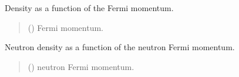 \documentclass[letterpaper,10pt,english]{sphinxmanual}
\begin{document}

\begin{fulllineitems}
\label{\detokenize{source/api/setup_eos_ffg:nucleardatapy.setup_eos_ffg.den}}
\pysigstartsignatures
\pysiglinewithargsret
{}
{}
{}
\pysigstopsignatures
\sphinxAtStartPar
Density as a function of the Fermi momentum.
\begin{quote}\begin{description}
\sphinxAtStartPar
{} () \textendash{} Fermi momentum.

\end{description}\end{quote}

\end{fulllineitems}


\begin{fulllineitems}
\label{\detokenize{source/api/setup_eos_ffg:nucleardatapy.setup_eos_ffg.den_n}}
\pysigstartsignatures
\pysiglinewithargsret
{}
{}
{}
\pysigstopsignatures
\sphinxAtStartPar
Neutron density as a function of the neutron Fermi momentum.
\begin{quote}\begin{description}
\sphinxAtStartPar
{} () \textendash{} neutron Fermi momentum.

\end{description}\end{quote}

\end{fulllineitems}
\end{document}
